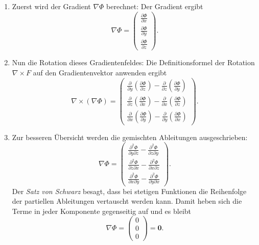\begin{enumerate}
    \item Zuerst wird der Gradient $\nabla\Phi$ berechnet:
    Der Gradient ergibt
    $$
    \nabla \Phi =
    \begin{pmatrix}
        \frac{\partial \Phi}{\partial x} \\
        \frac{\partial \Phi}{\partial y} \\
        \frac{\partial \Phi}{\partial z}
    \end{pmatrix}.
    $$

    \item Nun die Rotation dieses Gradientenfeldes: Die Definitionsformel der Rotation $\nabla \times F$ auf den Gradientenvektor anwenden ergibt
    $$
    \nabla \times (\nabla \Phi) =
    \begin{pmatrix}
        \frac{\partial}{\partial y}\left(\frac{\partial \Phi}{\partial z}\right) - \frac{\partial}{\partial z}\left(\frac{\partial \Phi}{\partial y}\right) \\
        \frac{\partial}{\partial z}\left(\frac{\partial \Phi}{\partial x}\right) - \frac{\partial}{\partial x}\left(\frac{\partial \Phi}{\partial z}\right) \\
        \frac{\partial}{\partial x}\left(\frac{\partial \Phi}{\partial y}\right) - \frac{\partial}{\partial y}\left(\frac{\partial \Phi}{\partial x}\right)
    \end{pmatrix}.
    $$

    \item %
    
    Zur besseren Übersicht werden die gemischten Ableitungen ausgeschrieben:
    $$
    \nabla \Phi =
    \begin{pmatrix}
        \frac{\partial^2 \Phi}{\partial y \partial z} - \frac{\partial^2 \Phi}{\partial z \partial y} \\
        \frac{\partial^2 \Phi}{\partial z \partial x} - \frac{\partial^2 \Phi}{\partial x \partial z} \\
        \frac{\partial^2 \Phi}{\partial x \partial y} - \frac{\partial^2 \Phi}{\partial y \partial x}
    \end{pmatrix}.
    $$
    Der \emph{Satz von Schwarz} besagt, dass bei stetigen Funktionen die Reihenfolge der partiellen Ableitungen vertauscht werden kann. Damit heben sich die Terme in jeder Komponente gegenseitig auf und es bleibt
    $$
    \nabla \Phi  =
    \begin{pmatrix}
        0 \\
        0 \\
        0
    \end{pmatrix} = \mathbf{0}.
    $$
\end{enumerate}

